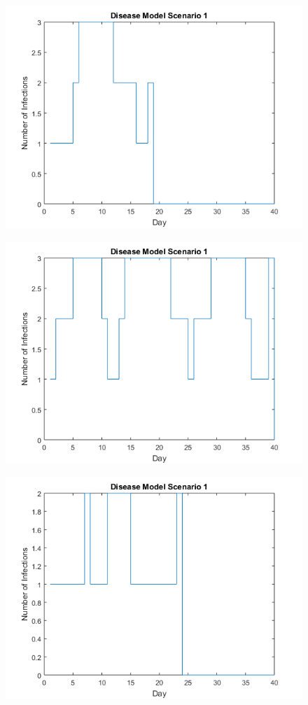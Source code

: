 \documentclass[12pt]{article}
\numberwithin{equation}{section}
\begin{document}
\begin{figure}[tp]
\includegraphics{modelsc1b}
\end{figure}
\begin{figure}[bp]
\includegraphics{modelsc1c}
\end{figure}
\begin{figure}[tp]
\includegraphics{modelsc1d}
\end{figure}
\end{document}
